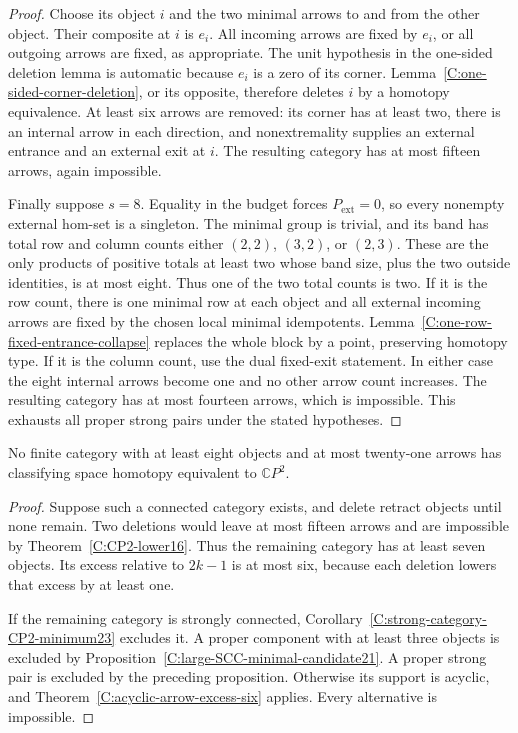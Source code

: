 \begin{proof}
Choose its object $i$ and the two minimal arrows to
and from the other object.  Their composite at $i$
is $e_i$.  All incoming arrows are fixed by $e_i$,
or all outgoing arrows are fixed, as appropriate.
The unit hypothesis in the one-sided deletion lemma
is automatic because $e_i$ is a zero of its corner.
Lemma~\ref{C:one-sided-corner-deletion}, or its opposite,
therefore deletes $i$ by a homotopy equivalence.
At least six arrows are removed: its corner has at
least two, there is an internal arrow in each direction,
and nonextremality supplies an external entrance and
an external exit at $i$.  The resulting category has
at most fifteen arrows, again impossible.

Finally suppose $s=8$.  Equality in the budget forces
$P_{\mathrm{ext}}=0$, so every nonempty external
hom-set is a singleton.  The minimal group is trivial,
and its band has total row and column counts either
$(2,2)$, $(3,2)$, or $(2,3)$.  These are the only
products of positive totals at least two whose band
size, plus the two outside identities, is at most
eight.  Thus one of the two total counts is two.
If it is the row count, there is one minimal row at
each object and all external incoming arrows are
fixed by the chosen local minimal idempotents.
Lemma~\ref{C:one-row-fixed-entrance-collapse} replaces
the whole block by a point, preserving homotopy type.
If it is the column count, use the dual fixed-exit
statement.  In either case the eight internal arrows
become one and no other arrow count increases.
The resulting category has at most fourteen arrows,
which is impossible.  This exhausts all proper strong
pairs under the stated hypotheses.
\end{proof}

\begin{corollary}\label{C:eight-objects-through21}
No finite category with at least eight objects and at
most twenty-one arrows has classifying space
homotopy equivalent to $\mathbb CP^2$.
\end{corollary}
\begin{proof}
Suppose such a connected category exists, and delete
retract objects until none remain.  Two deletions
would leave at most fifteen arrows and are impossible
by Theorem~\ref{C:CP2-lower16}.  Thus the remaining
category has at least seven objects.  Its excess
relative to $2k-1$ is at most six, because each
deletion lowers that excess by at least one.

If the remaining category is strongly connected,
Corollary~\ref{C:strong-category-CP2-minimum23}
excludes it.  A proper component with at least three
objects is excluded by
Proposition~\ref{C:large-SCC-minimal-candidate21}.
A proper strong pair is excluded by the preceding
proposition.  Otherwise its support is acyclic,
and Theorem~\ref{C:acyclic-arrow-excess-six} applies.
Every alternative is impossible.
\end{proof}
